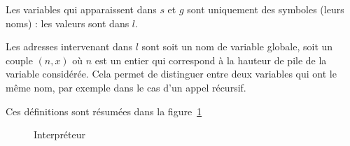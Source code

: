 Les variables qui apparaissent dans $s$ et $g$ sont uniquement des symboles
(leurs noms) : les valeurs sont dans $l$.

Les adresses intervenant dans $l$ sont soit un nom de variable globale, soit un
couple $(n, x)$ où $n$ est un entier qui correspond à la hauteur de pile de la
variable considérée. Cela permet de distinguer entre deux variables qui ont le
même nom, par exemple dans le cas d'un appel récursif.

Ces définitions sont résumées dans la figure~\ref{fig:interp}

\begin{figure}






  \caption{Interpréteur}
  \label{fig:interp}
\end{figure}

